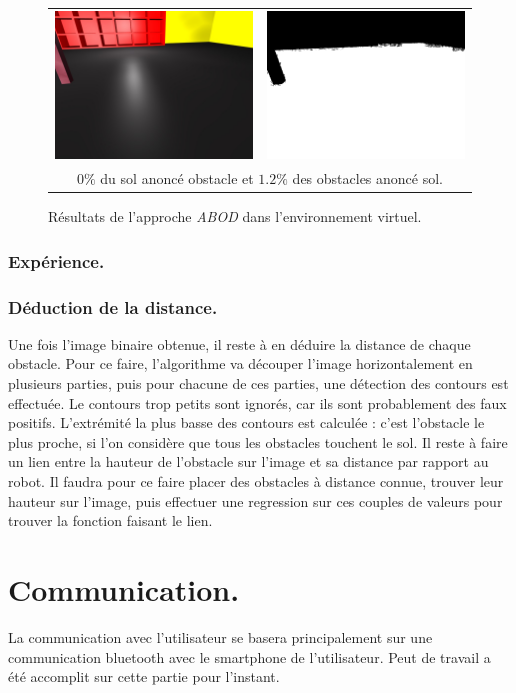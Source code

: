 \documentclass{article}
\begin{document}
\begin{figure}
\begin{center}
\begin{tabular}{|cc|}
            \hline
            \includegraphics[width=0.4\linewidth]{rcs/abodv2s.png} & \includegraphics[width=0.4\linewidth]{rcs/abodv2r.png} \\
            \multicolumn{2}{|c|}{$0\%$ du sol anoncé obstacle et $1.2\%$ des obstacles anoncé sol.} \\
            \hline
        \end{tabular}
    \end{center}
    \caption{Résultats de l'approche \emph{ABOD} dans l'environnement virtuel.}
    \label{abod_simu}
\end{figure}

\subsubsection{Expérience.}

\subsubsection{Déduction de la distance.}
Une fois l'image binaire obtenue, il reste à en déduire la distance de chaque obstacle. Pour ce faire, l'algorithme va découper l'image horizontalement en plusieurs parties, puis pour chacune de ces parties, une détection des contours est effectuée. Le contours trop petits sont ignorés, car ils sont probablement des faux positifs. L'extrémité la plus basse des contours est calculée : c'est l'obstacle le plus proche, si l'on considère que tous les obstacles touchent le sol. Il reste à faire un lien entre la hauteur de l'obstacle sur l'image et sa distance par rapport au robot. Il faudra pour ce faire placer des obstacles à distance connue, trouver leur hauteur sur l'image, puis effectuer une regression sur ces couples de valeurs pour trouver la fonction faisant le lien.


\section{Communication.}
La communication avec l'utilisateur se basera principalement sur une communication bluetooth avec le smartphone de l'utilisateur. Peut de travail a été accomplit sur cette partie pour l'instant.

\newpage
\listoffigures
{}
\end{document}
